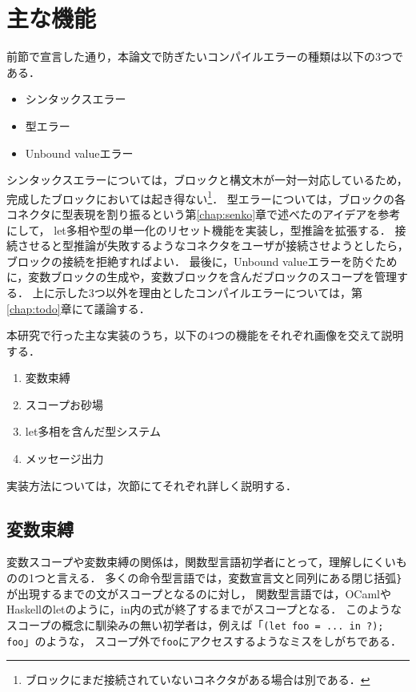 \chapter{主な機能}\label{chap:features}

前節で宣言した通り，本論文で防ぎたいコンパイルエラーの種類は以下の3つである．
\begin {itemize}
  \item シンタックスエラー
  \item 型エラー
  \item Unbound valueエラー
\end {itemize}

シンタックスエラーについては，ブロックと構文木が一対一対応しているため，
完成したブロックにおいては起き得ない\footnote{ブロックにまだ接続されていないコネクタがある場合は別である．}．
型エラーについては，ブロックの各コネクタに型表現を割り振るという第\ref{chap:senko}章で述べた\cite{Typed-Blockly}のアイデアを参考にして，
let多相や型の単一化のリセット機能を実装し，型推論を拡張する．
接続させると型推論が失敗するようなコネクタをユーザが接続させようとしたら，ブロックの接続を拒絶すればよい．
最後に，Unbound valueエラーを防ぐために，変数ブロックの生成や，変数ブロックを含んだブロックのスコープを管理する．
上に示した3つ以外を理由としたコンパイルエラーについては，第\ref{chap:todo}章にて議論する．

本研究で行った主な実装のうち，以下の4つの機能をそれぞれ画像を交えて説明する．
\begin {enumerate}
  \item 変数束縛
  \item スコープお砂場
  \item let多相を含んだ型システム
  \item メッセージ出力
\end {enumerate}
実装方法については，次節にてそれぞれ詳しく説明する．

\section {変数束縛}
変数スコープや変数束縛の関係は，関数型言語初学者にとって，理解しにくいものの1つと言える．
多くの命令型言語では，変数宣言文と同列にある閉じ括弧{\tt \}}が出現するまでの文がスコープとなるのに対し，
関数型言語では，OCamlやHaskellのletのように，in内の式が終了するまでがスコープとなる．
このようなスコープの概念に馴染みの無い初学者は，例えば「{\tt (let foo = ...\ in ?); foo}」のような，
スコープ外で{\tt foo}にアクセスするようなミスをしがちである．

